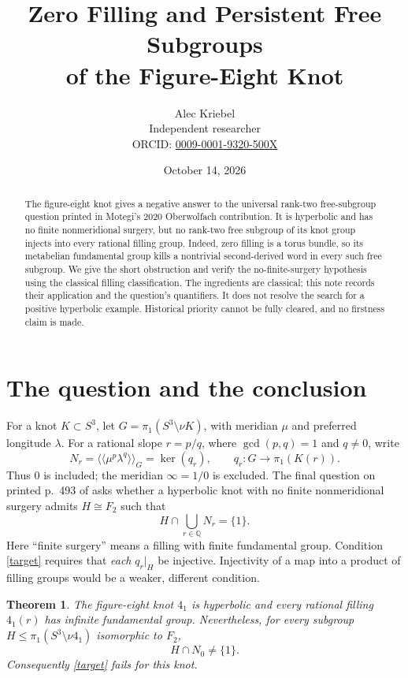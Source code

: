 \documentclass[11pt]{article}
\title{Zero Filling and Persistent Free Subgroups\\of the Figure-Eight Knot}
\author{Alec Kriebel\\\small Independent researcher\\\small ORCID: \href{https://orcid.org/0009-0001-9320-500X}{0009-0001-9320-500X}}
\date{October 14, 2026}
\newtheorem{theorem}{Theorem}
\newcommand{\Q}{\mathbb Q}
\begin{document}
\maketitle
\begin{abstract}
The figure-eight knot gives a negative answer to the universal rank-two
free-subgroup question printed in Motegi's 2020 Oberwolfach contribution.
It is hyperbolic and has no finite nonmeridional surgery, but no rank-two
free subgroup of its knot group injects into every rational filling group.
Indeed, zero filling is a torus bundle, so its metabelian fundamental group
kills a nontrivial second-derived word in every such free subgroup.
We give the short obstruction and verify the no-finite-surgery hypothesis
using the classical filling classification. The ingredients are classical;
this note records their application and the question's quantifiers. It does
not resolve the search for a positive hyperbolic example. Historical priority
cannot be fully cleared, and no firstness claim is made.
\end{abstract}

\section{The question and the conclusion}
For a knot $K\subset S^3$, let $G=\pi_1(S^3\setminus\nu K)$, with meridian
$\mu$ and preferred longitude $\lambda$. For a rational slope $r=p/q$,
where $\gcd(p,q)=1$ and $q\ne0$, write
\[
 N_r=\langle\!\langle\mu^p\lambda^q\rangle\!\rangle_G
      =\ker(q_r),\qquad
 q_r:G\longrightarrow\pi_1(K(r)).
\]
Thus $0$ is included; the meridian $\infty=1/0$ is excluded.
The final question on printed p.~493 of \cite{OWR} asks whether a hyperbolic
knot with no finite nonmeridional surgery admits $H\cong F_2$ such that
\begin{equation}\label{target}
 H\cap\bigcup_{r\in\Q}N_r=\{1\}.
\end{equation}
Here ``finite surgery'' means a filling with finite fundamental group.
Condition \eqref{target} requires that \emph{each} $q_r|_H$ be injective.
Injectivity of a map into a product of filling groups would be a weaker,
different condition.

\begin{theorem}\label{main}
The figure-eight knot $4_1$ is hyperbolic and every rational filling
$4_1(r)$ has infinite fundamental group. Nevertheless, for every subgroup
$H\le\pi_1(S^3\setminus\nu4_1)$ isomorphic to $F_2$,
\[
 H\cap N_0\ne\{1\}.
\]
Consequently \eqref{target} fails for this knot.
\end{theorem}
\end{document}
